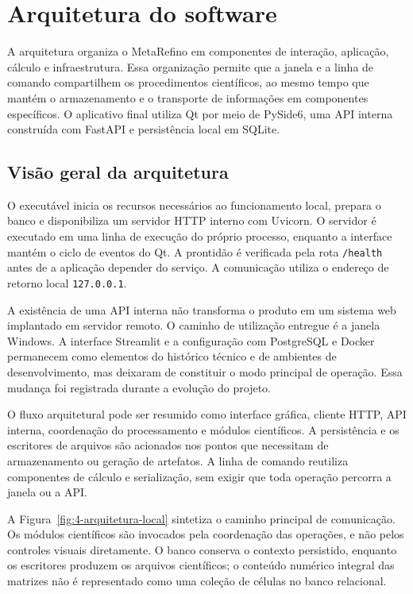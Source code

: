 \section{Arquitetura do software}
\label{sec:4-arquitetura}

A arquitetura organiza o MetaRefino em componentes de interação, aplicação, cálculo e infraestrutura. Essa organização permite que a janela e a linha de comando compartilhem os procedimentos científicos, ao mesmo tempo que mantém o armazenamento e o transporte de informações em componentes específicos. O aplicativo final utiliza Qt por meio de PySide6, uma API interna construída com FastAPI e persistência local em SQLite.

\subsection{Visão geral da arquitetura}

O executável inicia os recursos necessários ao funcionamento local, prepara o banco e disponibiliza um servidor HTTP interno com Uvicorn. O servidor é executado em uma linha de execução do próprio processo, enquanto a interface mantém o ciclo de eventos do Qt. A prontidão é verificada pela rota \texttt{/health} antes de a aplicação depender do serviço. A comunicação utiliza o endereço de retorno local \texttt{127.0.0.1}.

A existência de uma API interna não transforma o produto em um sistema web implantado em servidor remoto. O caminho de utilização entregue é a janela Windows. A interface Streamlit e a configuração com PostgreSQL e Docker permanecem como elementos do histórico técnico e de ambientes de desenvolvimento, mas deixaram de constituir o modo principal de operação. Essa mudança foi registrada durante a evolução do projeto.

O fluxo arquitetural pode ser resumido como interface gráfica, cliente HTTP, API interna, coordenação do processamento e módulos científicos. A persistência e os escritores de arquivos são acionados nos pontos que necessitam de armazenamento ou geração de artefatos. A linha de comando reutiliza componentes de cálculo e serialização, sem exigir que toda operação percorra a janela ou a API.

A Figura~\ref{fig:4-arquitetura-local} sintetiza o caminho principal de comunicação. Os módulos científicos são invocados pela coordenação das operações, e não pelos controles visuais diretamente. O banco conserva o contexto persistido, enquanto os escritores produzem os arquivos científicos; o conteúdo numérico integral das matrizes não é representado como uma coleção de células no banco relacional.

